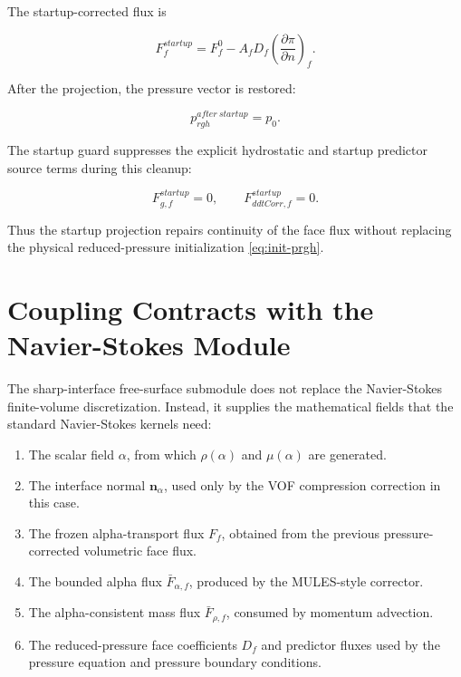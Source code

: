 \documentclass[11pt]{article}
\begin{document}
The startup-corrected flux is

\begin{equation}
  F_f^{startup}
  =
  F_f^0
  -
  A_fD_f
  \left(\frac{\partial\pi}{\partial n}\right)_f.
\end{equation}

After the projection, the pressure vector is restored:

\begin{equation}
  p_{rgh}^{after\ startup}=p_0.
\end{equation}

The startup guard suppresses the explicit hydrostatic and startup predictor
source terms during this cleanup:

\begin{equation}
  F_{g,f}^{startup}=0,
  \qquad
  F_{ddtCorr,f}^{startup}=0.
\end{equation}

Thus the startup projection repairs continuity of the face flux without
replacing the physical reduced-pressure initialization \eqref{eq:init-prgh}.

\section{Coupling Contracts with the Navier-Stokes Module}

The sharp-interface free-surface submodule does not replace the Navier-Stokes
finite-volume discretization.  Instead, it supplies the mathematical fields
that the standard Navier-Stokes kernels need:

\begin{enumerate}[leftmargin=2.5em]
  \item The scalar field \(\alpha\), from which \(\rho(\alpha)\) and
        \(\mu(\alpha)\) are generated.
  \item The interface normal \(\mathbf{n}_{\alpha}\), used only by the VOF
        compression correction in this case.
  \item The frozen alpha-transport flux \(F_f\), obtained from the previous
        pressure-corrected volumetric face flux.
  \item The bounded alpha flux \(\bar{F}_{\alpha,f}\), produced by the MULES-style
        corrector.
  \item The alpha-consistent mass flux \(\bar{F}_{\rho,f}\), consumed by
        momentum advection.
  \item The reduced-pressure face coefficients \(D_f\) and predictor fluxes
        used by the pressure equation and pressure boundary conditions.
\end{enumerate}
\end{document}
